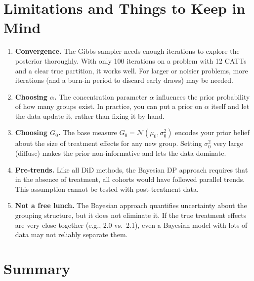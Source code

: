 \documentclass[12pt]{article}
\begin{document}
\section{Limitations and Things to Keep in Mind}

\begin{enumerate}

  \item \textbf{Convergence.} The Gibbs sampler needs enough iterations to
    explore the posterior thoroughly. With only 100 iterations on a problem
    with 12 CATTs and a clear true partition, it works well. For larger or
    noisier problems, more iterations (and a burn-in period to discard early
    draws) may be needed.

  \item \textbf{Choosing $\alpha$.} The concentration parameter $\alpha$
    influences the prior probability of how many groups exist. In practice,
    you can put a prior on $\alpha$ itself and let the data update it, rather
    than fixing it by hand.

  \item \textbf{Choosing $G_0$.} The base measure $G_0 = \mathcal{N}(\mu_0,
    \sigma_0^2)$ encodes your prior belief about the size of treatment effects
    for any new group. Setting $\sigma_0^2$ very large (diffuse) makes the
    prior non-informative and lets the data dominate.

  \item \textbf{Pre-trends.} Like all DiD methods, the Bayesian DP approach
    requires that in the absence of treatment, all cohorts would have followed
    parallel trends. This assumption cannot be tested with post-treatment data.

  \item \textbf{Not a free lunch.} The Bayesian approach quantifies uncertainty
    about the grouping structure, but it does not eliminate it. If the true
    treatment effects are very close together (e.g., 2.0 vs.\ 2.1), even a
    Bayesian model with lots of data may not reliably separate them.

\end{enumerate}

\section{Summary}
\end{document}
